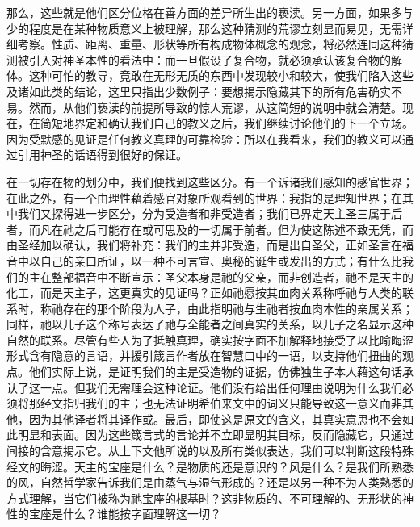 那么，这些就是他们区分位格在善方面的差异所生出的亵渎。另一方面，如果多与少的程度是在某种物质意义上被理解，那么这种猜测的荒谬立刻显而易见，无需详细考察。性质、距离、重量、形状等所有构成物体概念的观念，将必然连同这种猜测被引入对神圣本性的看法中：而一旦假设了复合物，就必须承认该复合物的解体。这种可怕的教导，竟敢在无形无质的东西中发现较小和较大，使我们陷入这些及诸如此类的结论，这里只指出少数例子：要想揭示隐藏其下的所有危害确实不易。然而，从他们亵渎的前提所导致的惊人荒谬，从这简短的说明中就会清楚。现在，在简短地界定和确认我们自己的教义之后，我们继续讨论他们的下一个立场。因为受默感的见证是任何教义真理的可靠检验：所以在我看来，我们的教义可以通过引用神圣的话语得到很好的保证。\par

在一切存在物的划分中，我们便找到这些区分。有一个诉诸我们感知的感官世界；在此之外，有一个由理性藉着感官对象所观看到的世界：我指的是理知世界；在其中我们又探得进一步区分，分为受造者和非受造者；我们已界定天主圣三属于后者，而凡在祂之后可能存在或可思及的一切属于前者。但为使这陈述不致无凭，而由圣经加以确认，我们将补充：我们的主并非受造，而是出自圣父，正如圣言在福音中以自己的亲口所证，以一种不可言宣、奥秘的诞生或发出的方式；有什么比我们的主在整部福音中不断宣示：圣父本身是祂的父亲，而非创造者，祂不是天主的化工，而是天主子，这更真实的见证吗？正如祂愿按其血肉关系称呼祂与人类的联系时，称祂存在的那个阶段为人子，由此指明祂与生祂者按血肉本性的亲属关系；同样，祂以儿子这个称号表达了祂与全能者之间真实的关系，以儿子之名显示这种自然的联系。尽管有些人为了抵触真理，确实按字面不加解释地接受了以比喻晦涩形式含有隐意的言语，并援引箴言作者放在智慧口中的一语，以支持他们扭曲的观点。他们实际上说，是证明我们的主是受造物的证据，仿佛独生子本人藉这句话承认了这一点。但我们无需理会这种论证。他们没有给出任何理由说明为什么我们必须将那经文指归我们的主；也无法证明希伯来文中的词义只能导致这一意义而非其他，因为其他译者将其译作或。最后，即使这是原文的含义，其真实意思也不会如此明显和表面。因为这些箴言式的言论并不立即显明其目标，反而隐藏它，只通过间接的含意揭示它。从上下文他所说的以及所有类似表达，我们可以判断这段特殊经文的晦涩。天主的宝座是什么？是物质的还是意识的？风是什么？是我们所熟悉的风，自然哲学家告诉我们是由蒸气与湿气形成的？还是以另一种不为人类熟悉的方式理解，当它们被称为祂宝座的根基时？这非物质的、不可理解的、无形状的神性的宝座是什么？谁能按字面理解这一切？\par


